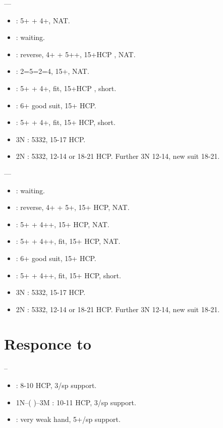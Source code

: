 \documentclass[12pt,twoside,a5paper]{report}%
\begin{document}
	----
	\begin{itemize}
	\renewcommand{\labelitemi}{}
	\item {} : 5+\he{} + 4+\di{}, NAT.
	\item {} : waiting.
	\item {} : reverse, 4+\sp{} + 5+\he{}+, 15+HCP , NAT.
	\item {} : 2=5=2=4, 15+, NAT.
	\item {} : 5+\he{} + 4+\cl{}, fit, 15+HCP , short\di{}.
	\item {} : 6+\he{} good suit, 15+ HCP.
	\item {} : 5+\he{} + 4+\cl{}, fit, 15+ HCP, short\sp{}.
	\item 3N : 5332, 15-17 HCP.
	\item 2N : 5332, 12-14 or 18-21 HCP. Further 3N 12-14, new suit 18-21.
	\end{itemize}

	----
	\begin{itemize}
	\renewcommand{\labelitemi}{}
	\item {} : waiting.
	\item {} : reverse, 4+\sp{} + 5+\he{}, 15+ HCP, NAT.
	\item {} : 5+\he{} + 4+\cl{}+, 15+ HCP, NAT.
	\item {} : 5+\he{} + 4+\di{}+, fit, 15+ HCP, NAT.
	\item {} : 6+\he{} good suit, 15+ HCP.
	\item {} : 5+\he{} + 4+\di{}+, fit, 15+ HCP, short\sp{}.
	\item 3N : 5332, 15-17 HCP.
	\item 2N : 5332, 12-14 or 18-21 HCP. Further 3N 12-14, new suit 18-21.
	\end{itemize}

	\chapter*{Responce to }
	-- \\
	\begin{itemize}
	\renewcommand{\labelitemi}{}
	\item {} : 8-10 HCP, 3/sp{} support.
	\item 1N--( )--3M : 10-11 HCP, 3/sp{} support.
	\item {} : very weak hand, 5+/sp{} support.
	\end{itemize}
\end{document}
